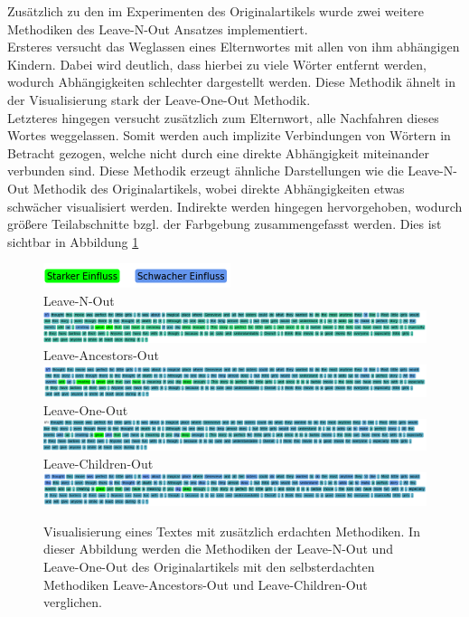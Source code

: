 \documentclass[DIV=13,fontsize=11pt]{scrartcl}
\begin{document}
Zusätzlich zu den im Experimenten des Originalartikels wurde zwei weitere Methodiken des Leave-N-Out Ansatzes implementiert.\\

Ersteres versucht das Weglassen eines Elternwortes mit allen von ihm abhängigen Kindern. Dabei wird deutlich, dass
hierbei zu viele Wörter entfernt werden, wodurch Abhängigkeiten schlechter dargestellt werden. Diese Methodik
ähnelt in der Visualisierung stark der Leave-One-Out Methodik.\\

Letzteres hingegen versucht zusätzlich zum Elternwort, alle Nachfahren dieses Wortes weggelassen. Somit werden auch
implizite Verbindungen von Wörtern in Betracht gezogen, welche nicht durch eine direkte Abhängigkeit miteinander
verbunden sind. Diese Methodik erzeugt ähnliche Darstellungen wie die Leave-N-Out Methodik des
Originalartikels, wobei direkte Abhängigkeiten etwas schwächer visualisiert werden. Indirekte werden
hingegen hervorgehoben, wodurch größere Teilabschnitte bzgl. der Farbgebung zusammengefasst werden.
Dies ist sichtbar in Abbildung \ref{fig:ex7}

\begin{figure}[H]
    \centering
    \includegraphics[]{img/legend.png}\\
    Leave-N-Out\\
    \includegraphics[width=\linewidth]{img/own_ex_lno.png}\\
    Leave-Ancestors-Out\\
    \includegraphics[width=\linewidth]{img/own_ex_lao.png}\\
    Leave-One-Out\\
    \includegraphics[width=\linewidth]{img/own_ex_loo.png}\\
    Leave-Children-Out\\
    \includegraphics[width=\linewidth]{img/own_ex_lco.png}\\
    \caption{Visualisierung eines Textes mit zusätzlich erdachten Methodiken. In dieser Abbildung werden die Methodiken der Leave-N-Out und Leave-One-Out des Originalartikels mit den selbsterdachten Methodiken Leave-Ancestors-Out und Leave-Children-Out verglichen.}
    \label{fig:ex7}
\end{figure}
\end{document}
